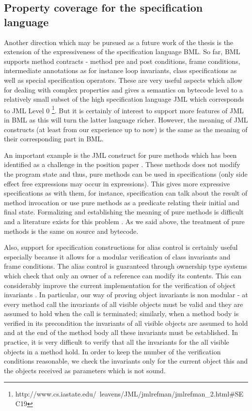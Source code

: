  



\subsection{Property coverage for the specification language}
Another direction which may be pursued as a future work of the thesis  is the extension of the expressiveness of the specification language BML. 
So far, BML supports method contracts - method pre and post  conditions, frame conditions, intermediate annotations as for instance
loop invariants, class specifications as well as special specification operators.
These are very useful aspects which allow for dealing with complex properties and 
gives a semantics on bytecode level  to a relatively small subset of the 
high specification language JML which corresponds to JML Level 0 \footnote{ http://www.cs.iastate.edu/~leavens/JML/jmlrefman/jmlrefman\_2.html\#SEC19}. 
 But it is certainly of interest to support more features of JML in BML
as this will turn the latter language richer. However, the meaning  of JML constructs 
(at least from our experience up to  now) is the same as the meaning of their corresponding part in BML.  

 An important example is the  JML construct for pure methods which has been  identified as  a challenge in the position paper \cite{LeavensLeinoMueller06}. 
 These methods does not modify the program state and thus, pure methods can be used in specifications 
 (only side effect free  expressions may occur in expressions).
 This gives more expressive  specifications as with them, for instance, specification can talk about the result of method invocation or use pure methods
 as a predicate relating their  initial and final state. 
 Formalizing and establishing the meaning of pure methods is difficult and a literature exists for this problem \cite{DarvasMueller06}.
 As we said above, the treatment of pure methods is the same on source and bytecode.

Also, support for specification constructions for alias control is certainly useful  especially because it allows for a modular verification 
of class invariants and frame conditions.
The alias control is guaranteed through ownership type systems which check that only an owner of a reference can modify its contents.
 This can considerably improve the current implementation for the verification of object invariants  \cite{DietlMueller05}.
In particular, our way of proving object invariants is non modular - at every method call the invariants of all visible 
objects must be valid and they are assumed to hold when the call is terminated; similarly, when a method body is verified in its precondition the invariants of all visible
objects are assumed to hold and at the end of the method body all these invariants must be established. 
In practice, it is very difficult to verify that all the invariants for the all visible objects in a method  hold.
In order to keep the number of the verification conditions reasonable, we check the invariants only for the current object this and the 
objects received as parameters which is not sound.

